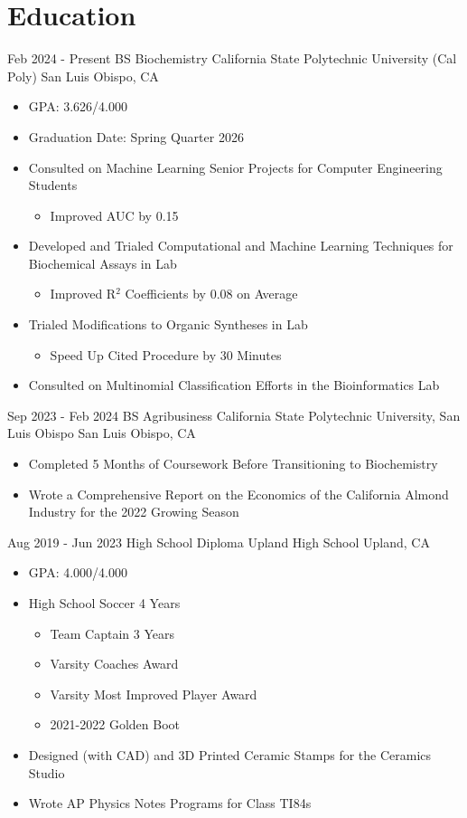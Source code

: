 \documentclass[11pt]{moderncv}
\begin{document}
\section{Education}
\cventry
{Feb 2024 - Present}
{BS Biochemistry}
{California State Polytechnic University (Cal Poly)}
{San Luis Obispo, CA}
{}
{%
\begin{itemize}
\item GPA: 3.626/4.000
\item Graduation Date: Spring Quarter 2026
\item Consulted on Machine Learning Senior Projects for Computer Engineering Students
  \begin{itemize}
  \item Improved AUC by 0.15
  \end{itemize}
\item Developed and Trialed Computational and Machine Learning Techniques for Biochemical Assays in Lab
  \begin{itemize}
  \item Improved R$^2$ Coefficients by 0.08 on Average
  \end{itemize}
\item Trialed Modifications to Organic Syntheses in Lab
  \begin{itemize}
  \item Speed Up Cited Procedure by 30 Minutes
  \end{itemize}
\item Consulted on Multinomial Classification Efforts in the Bioinformatics Lab
\end{itemize}
}
\cventry
{Sep 2023 - Feb 2024}
{BS Agribusiness}
{California State Polytechnic University, San Luis Obispo}
{San Luis Obispo, CA}
{}
{%
\begin{itemize}
\item Completed 5 Months of Coursework Before Transitioning to Biochemistry
\item Wrote a Comprehensive Report on the Economics of the California Almond Industry for the 2022 Growing Season
\end{itemize}
}
\cventry
{Aug 2019 - Jun 2023}
{High School Diploma}
{Upland High School}
{Upland, CA}
{}
{%
\begin{itemize}
\item GPA: 4.000/4.000
\item High School Soccer 4 Years
  \begin{itemize}
  \item Team Captain 3 Years
  \item Varsity Coaches Award
  \item Varsity Most Improved Player Award
  \item 2021-2022 Golden Boot
  \end{itemize}
\item Designed (with CAD) and 3D Printed Ceramic Stamps for the Ceramics Studio
\item Wrote AP Physics Notes Programs for Class TI84s
\end{itemize}
}
\end{document}
